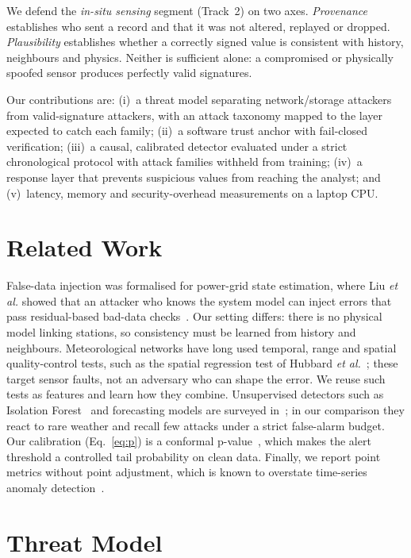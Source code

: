\documentclass[conference]{IEEEtran}
\begin{document}
We defend the \emph{in-situ sensing} segment (Track~2) on two axes. \emph{Provenance} establishes who sent a
record and that it was not altered, replayed or dropped. \emph{Plausibility} establishes whether a correctly
signed value is consistent with history, neighbours and physics. Neither is sufficient alone: a compromised
or physically spoofed sensor produces perfectly valid signatures.

Our contributions are: (i)~a threat model separating network/storage attackers from valid-signature
attackers, with an attack taxonomy mapped to the layer expected to catch each family; (ii)~a software
trust anchor with fail-closed verification; (iii)~a causal, calibrated detector evaluated under a strict
chronological protocol with attack families withheld from training; (iv)~a response layer that prevents
suspicious values from reaching the analyst; and (v)~latency, memory and security-overhead measurements on
a laptop CPU.

\section{Related Work}

False-data injection was formalised for power-grid state estimation, where Liu \emph{et al.} showed that an
attacker who knows the system model can inject errors that pass residual-based bad-data checks~\cite{liu-fdi}.
Our setting differs: there is no physical model linking stations, so consistency must be learned from
history and neighbours. Meteorological networks have long used temporal, range and spatial quality-control
tests, such as the spatial regression test of Hubbard \emph{et al.}~\cite{hubbard-qc}; these target sensor
faults, not an adversary who can shape the error. We reuse such tests as features and learn how they combine.
Unsupervised detectors such as Isolation Forest~\cite{iforest} and forecasting models are surveyed
in~\cite{chandola}; in our comparison they react to rare weather and recall few attacks under a strict
false-alarm budget. Our calibration (Eq.~\ref{eq:p}) is a conformal p-value~\cite{vovk}, which makes the
alert threshold a controlled tail probability on clean data. Finally, we report point metrics without point
adjustment, which is known to overstate time-series anomaly detection~\cite{kim-pa}.

\section{Threat Model}
\end{document}

